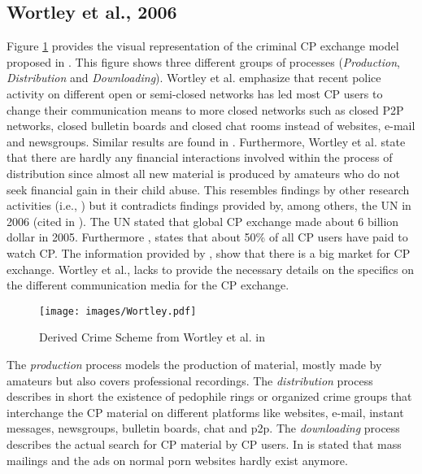 \documentclass{sig-alternate-br}
\begin{document}
\subsection{Wortley et al., 2006 \cite{wortley2006child}}
Figure \ref{fig:wortley_01} provides the visual representation of the criminal CP exchange model proposed in \cite{wortley2006child}. This figure shows three different groups of processes (\textit{Production}, \textit{Distribution} and \textit{Downloading}).
Wortley et al. \cite{wortley2006child} emphasize that recent police activity on different open or semi-closed networks has led most CP users to change their communication means to more closed networks such as closed P2P networks, closed bulletin boards and closed chat rooms instead of websites, e-mail and newsgroups. Similar results are found in \cite{wijk2009achter, callanan2009internet}. Furthermore, Wortley et al. state that there are hardly any financial interactions involved within the process of distribution since almost all new material is produced by amateurs who do not seek financial gain in their child abuse. This resembles findings by other research activities (i.e., \cite{beech2008internet,wijk2009achter}) but it contradicts findings provided by, among others, the UN in 2006 (cited in \cite{wijk2009achter}). The UN stated that global CP exchange made about 6 billion dollar in 2005. Furthermore \cite{webb2007characteristics}, states that about 50\% of all CP users have paid to watch CP. The information provided by \cite{beech2008internet,wijk2009achter}, \cite{webb2007characteristics} show that there is a big market for CP exchange. Wortley et al., \cite{wortley2006child} lacks to provide the necessary details on the specifics on the different communication media for the CP exchange.

\begin{figure}[ht]
\centering
\texttt{[image: images/Wortley.pdf]}
\caption{Derived Crime Scheme from Wortley et al. in \cite{wortley2006child}}
\label{fig:wortley_01}
\end{figure}

The \textit{production} process models the production of material, mostly made by amateurs but also covers professional recordings. The \textit{distribution} process describes in short the existence of pedophile rings or organized crime groups that interchange the CP material on different platforms like websites, e-mail, instant messages, newsgroups, bulletin boards, chat and p2p. The \textit{downloading} process describes the actual search for CP material by CP users. In \cite{wortley2006child} is stated that mass mailings and the ads on normal porn websites hardly exist anymore.
\end{document}
